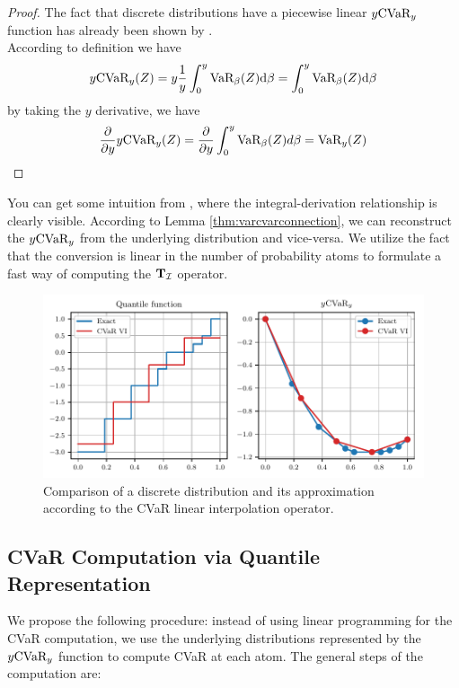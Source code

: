 \begin{proof}
The fact that discrete distributions have a piecewise linear $y\text{CVaR}_y$ function has already been shown by \citet{rockafellar2000optimization}.
\\
According to definition  we have
\begin{equation*}
y\text{CVaR}_y(Z) = y\dfrac{1}{y}\int_0^y \text{VaR}_\beta(Z) \text{d} \beta = \int_0^y \text{VaR}_\beta(Z) \text{d} \beta
\end{equation*}
by taking the $y$ derivative, we have
\begin{equation*}
\dfrac{\partial}{\partial y} y \text{CVaR}_y(Z) = \dfrac{\partial}{\partial y} \int_0^y \text{VaR}_\beta(Z) d\beta = \text{VaR}_y(Z)
\end{equation*}
\end{proof}
You can get some intuition from , where the integral-derivation relationship is clearly visible.
According to Lemma \ref{thm:varcvarconnection}, we can reconstruct the $y\text{CVaR}_y$ from the underlying distribution and vice-versa. We utilize the fact that the conversion is linear in the number of probability atoms to formulate a fast way of computing the $\mathbf{T}_{\mathcal{I}}$ operator.

\begin{figure}
\center
\includegraphics[width=0.8\linewidth]{gfx/cvar_visualized.pdf}
\caption{Comparison of a discrete distribution and its approximation according to the CVaR linear interpolation operator.}
\label{fig:cvarvisual}
\end{figure}

\subsection{CVaR Computation via Quantile Representation}

We propose the following procedure: instead of using linear programming for the CVaR computation, we use the underlying distributions represented by the $y\text{CVaR}_y$ function to compute CVaR at each atom. The general steps of the computation are:

